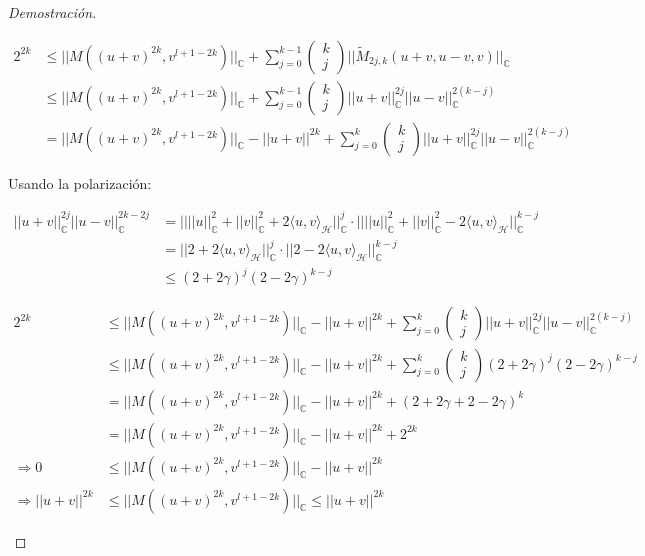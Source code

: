 \begin{proof}[Demostración]
\begin{enumerate}
		
		\begin{align*}
			2^{2k} &\leq||M((u+v)^{2k},v^{l+1-2k})||_{\mathbb{C}}+\sum_{j = 0}^{k-1}\begin{pmatrix}
				k\\
				j
			\end{pmatrix} ||\tilde{M}_{2j,k}(u+v,u-v,v)||_{\mathbb{C}} \\
			&\leq||M((u+v)^{2k},v^{l+1-2k})||_{\mathbb{C}}+\sum_{j = 0}^{k-1}\begin{pmatrix}
				k\\
				j
			\end{pmatrix} ||u+v||_{\mathbb{C}}^{2j} ||u-v||_{\mathbb{C}}^{2(k-j)}\\
			&=||M((u+v)^{2k},v^{l+1-2k})||_{\mathbb{C}}-||u+v||^{2k}+\sum_{j = 0}^{k}\begin{pmatrix}
				k\\
				j
			\end{pmatrix} ||u+v||_{\mathbb{C}}^{2j} ||u-v||_{\mathbb{C}}^{2(k-j)}
		\end{align*}
		
		Usando la polarización:
		
		\begin{align*}
			|| u+v||_{\mathbb{C}}^{2j}|| u-v||_{\mathbb{C}}^{2k-2j} 
			&=  ||||u||_{\mathbb{C}}^2 +||v||_{\mathbb{C}}^2 +2\langle u,v\rangle_{\mathcal{H}}||_{\mathbb{C}}^{j}\cdot ||||u||_{\mathbb{C}}^2 +||v||_{\mathbb{C}}^2 -2\langle u,v\rangle_{\mathcal{H}}||_{\mathbb{C}}^{k-j} \\
			&=  ||2+2\langle u,v\rangle_{\mathcal{H}}||_{\mathbb{C}}^{j}\cdot ||2 -2\langle u,v\rangle_{\mathcal{H}}||_{\mathbb{C}}^{k-j} \\
			&\leq (2+2\gamma)^{j}(2-2\gamma)^{k-j}
		\end{align*}
		
		\begin{align*}
			2^{2k} &\leq||M((u+v)^{2k},v^{l+1-2k})||_{\mathbb{C}}-||u+v||^{2k}+\sum_{j = 0}^{k}\begin{pmatrix}
				k\\
				j
			\end{pmatrix} ||u+v||_{\mathbb{C}}^{2j} ||u-v||_{\mathbb{C}}^{2(k-j)}\\
			&\leq||M((u+v)^{2k},v^{l+1-2k})||_{\mathbb{C}}-||u+v||^{2k}+\sum_{j = 0}^{k}\begin{pmatrix}
				k\\
				j
			\end{pmatrix} (2+2\gamma)^{j}(2-2\gamma)^{k-j}\\
			&=||M((u+v)^{2k},v^{l+1-2k})||_{\mathbb{C}}-||u+v||^{2k}+(2+2\gamma + 2 - 2\gamma)^k \\
			&=||M((u+v)^{2k},v^{l+1-2k})||_{\mathbb{C}}-||u+v||^{2k}+2^{2k} \\
			\Rightarrow 0 &\leq||M((u+v)^{2k},v^{l+1-2k})||_{\mathbb{C}}-||u+v||^{2k} \\
			\Rightarrow ||u+v||^{2k} &\leq||M((u+v)^{2k},v^{l+1-2k})||_{\mathbb{C}}  \leq ||u+v||^{2k}
		\end{align*}
		

\end{enumerate}
\end{proof}
